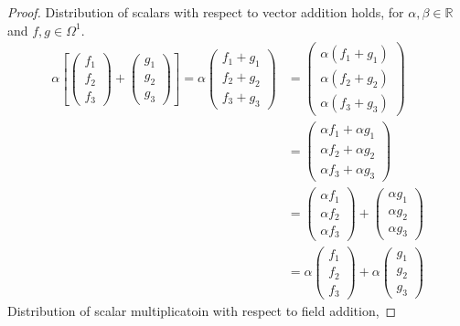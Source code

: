 \documentclass[12pt]{article}
\newcommand      {\Rm}         {{\mathbb R}}
\begin{document}
\begin{itemize}
\begin{itemize}
\begin{proof}
                Distribution of scalars with respect to vector addition holds, for $\alpha,\beta \in \Rm$ and $f,g\in \Omega^1$.
                \begin{align*}
                    \alpha\left[\begin{pmatrix}f_1 \\ f_2 \\ f_3 \end{pmatrix} + \begin{pmatrix}g_1 \\ g_2 \\ g_3 \end{pmatrix}\right] = \alpha \begin{pmatrix} f_1 + g_1 \\ f_2 + g_2 \\ f_3 + g_3 \end{pmatrix} &= \begin{pmatrix}\alpha(f_1 + g_1) \\ \alpha(f_2 + g_2) \\ \alpha (f_3 + g_3) \end{pmatrix} \\
                    &= \begin{pmatrix}\alpha f_1 + \alpha g_1 \\ \alpha f_2 + \alpha g_2 \\ \alpha f_3 + \alpha g_3 \end{pmatrix} \\ &= \begin{pmatrix}\alpha f_1 \\ \alpha f_2 \\ \alpha f_3 \end{pmatrix} + \begin{pmatrix}\alpha g_1 \\ \alpha g_2 \\ \alpha g_3 \end{pmatrix} \\ 
                    &=\alpha\begin{pmatrix} f_1 \\  f_2 \\  f_3 \end{pmatrix}+  \alpha\begin{pmatrix} g_1 \\  g_2 \\  g_3 \end{pmatrix}
                \end{align*}
                \newpage
                Distribution of scalar multiplicatoin with respect to field addition,

\end{proof}
\end{itemize}
\end{itemize}
\end{document}
